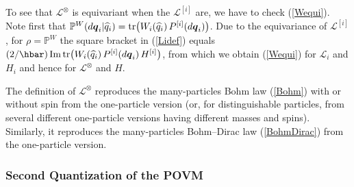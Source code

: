 \documentclass[12pt]{article}
\newcommand{\1}{\mathbf{1}} %
\newcommand{\tr}{\mathrm{tr}} %
\renewcommand{\Im}{\mathrm{Im}} %
\newcommand{\measure}{\mathbb{P}} %
\newcommand{\generator}{\mathscr{L}} %
\newcommand{\pov}{{P}}%
\newcommand{\vq}{{\boldsymbol q}}
\begin{document}
   To see that $\generator^\otimes$ is equivariant when the
   $\generator^{[i]}$ are, we have to check (\ref{Wequi}).  Note first
   that $\measure^W(d\vq_i|\hqi) = \tr \big( W_i(\hqi) \,
   \pov^{[i]}(d\vq_i) \big)$.  Due to the equivariance of
   $\generator^{[i]}$, for $\rho = \measure^W$ the square bracket in
   (\ref{Lidef}) equals $(2/\hbar) \, \Im \, \tr \big( W_i (\hqi) \,
   \pov^{[i]}(d\vq_i) \, H^{[i]} \big)$, from which we obtain
   (\ref{Wequi}) for $\generator_i$ and $H_i$ and hence for
   $\generator^\otimes$ and $H$.


The definition of $\generator^\otimes$ reproduces the many-particles
Bohm law (\ref{Bohm}) with or without spin from the one-particle
version (or, for distinguishable particles, from several different
one-particle versions having different masses and spins). Similarly,
it reproduces the many-particles Bohm--Dirac law (\ref{BohmDirac})
from the one-particle version.

\subsubsection{Second Quantization of the POVM}\label{sec:GammaPOVM}
\end{document}
